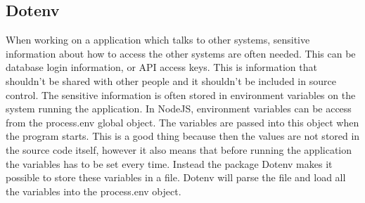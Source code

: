 \subsection{Dotenv}
When working on a application which talks to other systems, sensitive information about how to access the other systems are often needed. This can be database login information, or API access keys. This is information that shouldn't be shared with other people and it shouldn't be included in source control. The sensitive information is often stored in environment variables on the system running the application. In NodeJS, environment variables can be access from the process.env global object. The variables are passed into this object when the program starts. This is a good thing because then the values are not stored in the source code itself, however it also means that before running the application the variables has to be set every time. Instead the package Dotenv makes it possible to store these variables in a file. Dotenv will parse the file and load all the variables into the process.env object. 